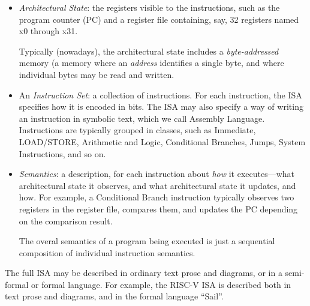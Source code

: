 \begin{itemize}


  \item \emph{Architectural State}: the registers visible to the
        instructions, such as the program counter (PC) and a register
        file containing, say, 32 registers named x0 through x31.

        Typically (nowadays), the architectural state includes a
        \emph{byte-addressed} memory (a memory where an \emph{address}
        identifies a single byte, and where individual bytes may be
        read and written.


  \item An \emph{Instruction Set}: a collection of instructions.  For
        each instruction, the ISA specifies how it is encoded in bits.
        The ISA may also specify a way of writing an instruction in
        symbolic text, which we call Assembly Language.  Instructions
        are typically grouped in classes, such as Immediate,
        LOAD/STORE, Arithmetic and Logic, Conditional Branches, Jumps,
        System Instructions, and so on.


  \item \emph{Semantics}: a description, for each instruction about
        \emph{how} it executes---what architectural state it observes,
        and what architectural state it updates, and how.  For
        example, a Conditional Branch instruction typically observes
        two registers in the register file, compares them, and updates
        the PC depending on the comparison result.

        The overal semantics of a program being executed is just a
        sequential composition of individual instruction semantics.

\end{itemize}


The full ISA may be described in ordinary text prose and diagrams, or
in a semi-formal or formal language.  For example, the RISC-V ISA is
described both in text prose and diagrams, and in the formal language
``Sail''.

